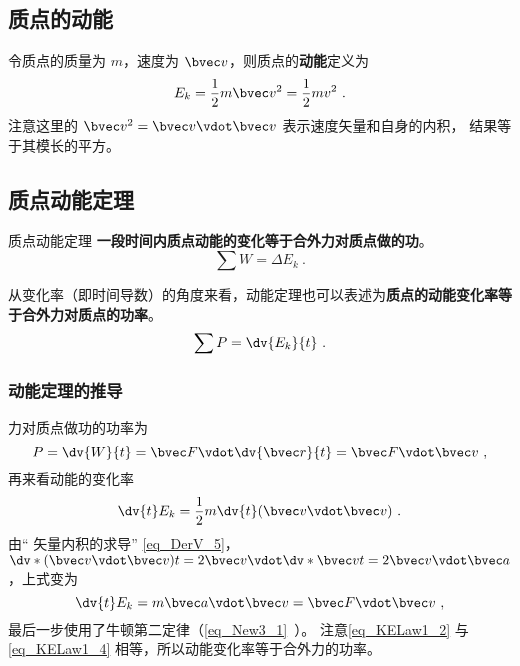 
\subsection{质点的动能}
令质点的质量为 $m$，速度为 $\bvec v$，则质点的\textbf{动能}定义为
\begin{equation}
E_k = \frac12 m\bvec v^2 = \frac12 mv^2~.
\end{equation}
注意这里的 $\bvec v^2 = \bvec v \vdot \bvec v$ 表示速度矢量和自身的内积， 结果等于其模长的平方。

\subsection{质点动能定理}
\begin{theorem}{质点动能定理}
\textbf{一段时间内质点动能的变化等于合外力对质点做的功}。
\begin{equation}
\sum W=\Delta E_k~.
\end{equation}

从变化率（即时间导数）的角度来看，动能定理也可以表述为\textbf{质点的动能变化率等于合外力对质点的功率}。
\begin{equation}
\sum P=\dv{E_k}{t}~.
\end{equation}
\end{theorem}

\subsubsection{动能定理的推导}
力对质点做功的功率为
\begin{equation}\label{eq_KELaw1_2}
P = \dv{W}{t} =  \bvec F\vdot \dv{\bvec r}{t} = \bvec F\vdot\bvec v~,
\end{equation}
再来看动能的变化率
\begin{equation}
\dv{t} E_k = \frac12 m\dv{t} (\bvec v\vdot\bvec v)~.
\end{equation}
由“ 矢量内积的求导” \autoref{eq_DerV_5}，$\dv*{(\bvec v\vdot\bvec v)}{t} = 2\bvec v\vdot \dv*{\bvec v}{t} = 2\bvec v\vdot\bvec a$，上式变为
\begin{equation}\label{eq_KELaw1_4}
\dv{t} E_k = m\bvec a\vdot\bvec v = \bvec F\vdot\bvec v~,
\end{equation}
最后一步使用了牛顿第二定律（\autoref{eq_New3_1}~）。 注意\autoref{eq_KELaw1_2} 与\autoref{eq_KELaw1_4} 相等，所以动能变化率等于合外力的功率。
